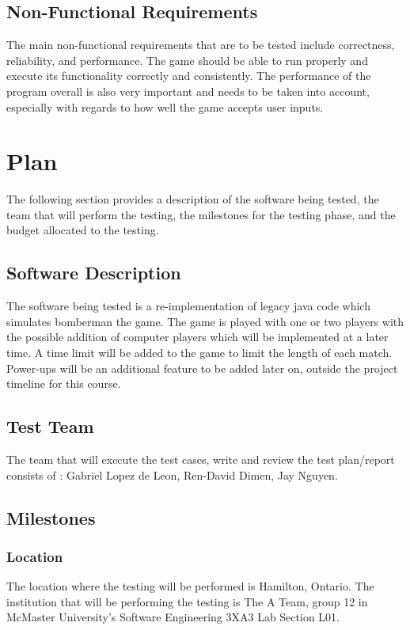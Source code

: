 \documentclass[12pt, letterpaper]{article}
\begin{document}
	\subsection{Non-Functional Requirements}
	\indent \indent The main non-functional requirements that are to be tested include correctness, reliability, and performance. The game should be able to run properly and execute its functionality correctly and consistently. The performance of the program overall is also very important and needs to be taken into account, especially with regards to how well the game accepts user inputs.
	
	\section{Plan}
	\indent \indent The following section provides a description of the software being tested, the team that will perform the testing, the milestones for the testing phase, and the budget allocated to the testing.
	
	\subsection{Software Description}
	\indent \indent The software being tested is a re-implementation of legacy java code which simulates bomberman the game. The game is played with one or two players with the possible addition of computer players which will be implemented at a later time. A time limit will be added to the game to limit the length of each match. Power-ups will be an additional feature to be added later on, outside the project timeline for this course.
	
	\subsection{Test Team}
	\indent \indent The team that will execute the test cases, write and review the test plan/report consists of : Gabriel Lopez de Leon, Ren-David Dimen, Jay Nguyen.
	
	\subsection{Milestones}
	
	\subsubsection{Location}
	The location where the testing will be performed is Hamilton, Ontario. The institution that will be performing the testing is The A Team, group 12 in McMaster University's Software Engineering 3XA3 Lab Section L01.
	
\end{document}
